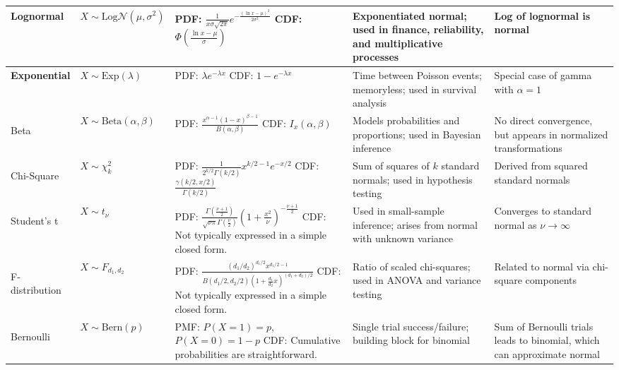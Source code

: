 \documentclass[10pt]{article}
\begin{document}
\begin{longtable}{|>{\bfseries}m{2cm}|m{2.8cm}|p{4.5cm}|p{5.2cm}|p{4.5cm}|}
Lognormal & $X \sim \mathrm{Log}\mathcal{N}(\mu, \sigma^2)$ & 
PDF: $\frac{1}{x\sigma\sqrt{2\pi}} e^{-\frac{(\ln x - \mu)^2}{2\sigma^2}}$ \newline
CDF: $\Phi\left(\frac{\ln x - \mu}{\sigma}\right)$ & 
Exponentiated normal; used in finance, reliability, and multiplicative processes & 
Log of lognormal is normal \\
\hline

Exponential & $X \sim \mathrm{Exp}(\lambda)$ & 
PDF: $\lambda e^{-\lambda x}$ \newline
CDF: $1 - e^{-\lambda x}$ & 
Time between Poisson events; memoryless; used in survival analysis & 
Special case of gamma with $\alpha = 1$ \\
\hline

Beta & $X \sim \mathrm{Beta}(\alpha, \beta)$ & 
PDF: $\frac{x^{\alpha - 1}(1 - x)^{\beta - 1}}{B(\alpha, \beta)}$ \newline
CDF: $I_x(\alpha, \beta)$ & 
Models probabilities and proportions; used in Bayesian inference & 
No direct convergence, but appears in normalized transformations \\
\hline

Chi-Square & $X \sim \chi^2_k$ & 
PDF: $\frac{1}{2^{k/2} \Gamma(k/2)} x^{k/2 - 1} e^{-x/2}$ \newline
CDF: $\frac{\gamma(k/2, x/2)}{\Gamma(k/2)}$ & 
Sum of squares of $k$ standard normals; used in hypothesis testing & 
Derived from squared standard normals \\
\hline

Student's t & $X \sim t_\nu$ & 
PDF: $\frac{\Gamma\left(\frac{\nu+1}{2}\right)}{\sqrt{\nu\pi} \Gamma\left(\frac{\nu}{2}\right)} \left(1 + \frac{x^2}{\nu}\right)^{-\frac{\nu+1}{2}}$ \newline CDF: Not typically expressed in a simple closed form. &
Used in small-sample inference; arises from normal with unknown variance & 
Converges to standard normal as $\nu \to \infty$ \\
\hline

F-distribution & $X \sim F_{d_1, d_2}$ & 
PDF: $\frac{(d_1/d_2)^{d_1/2} x^{d_1/2 - 1}}{B(d_1/2, d_2/2)(1 + \frac{d_1}{d_2}x)^{(d_1 + d_2)/2}}$ \newline CDF: Not typically expressed in a simple closed form. & 
Ratio of scaled chi-squares; used in ANOVA and variance testing & 
Related to normal via chi-square components \\
\hline

Bernoulli & $X \sim \mathrm{Bern}(p)$ & 
PMF: $P(X=1) = p$, $P(X=0) = 1 - p$ \newline CDF: Cumulative probabilities are straightforward. & 
Single trial success/failure; building block for binomial & 
Sum of Bernoulli trials leads to binomial, which can approximate normal \\
\hline


\end{longtable}
\end{document}
